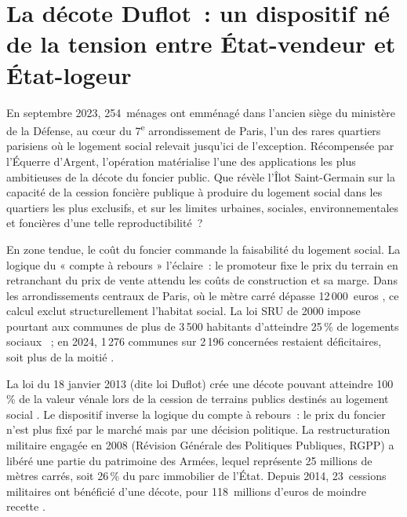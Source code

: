 \documentclass[a4paper,12pt]{article}
\begin{document}
\newpage
{}

\section{La décote Duflot~: un dispositif né de la tension entre État-vendeur et État-logeur}

En septembre 2023, 254~ménages ont emménagé dans l'ancien siège du ministère de la Défense, au cœur du 7\textsuperscript{e} arrondissement de Paris, l'un des rares quartiers parisiens où le logement social relevait jusqu'ici de l'exception. Récompensée par l'Équerre d'Argent, l'opération matérialise l'une des applications les plus ambitieuses de la décote du foncier public. Que révèle l'Îlot Saint-Germain sur la capacité de la cession foncière publique à produire du logement social dans les quartiers les plus exclusifs, et sur les limites urbaines, sociales, environnementales et foncières d'une telle reproductibilité~?

En zone tendue, le coût du foncier commande la faisabilité du logement social. La logique du « compte à rebours » l'éclaire~: le promoteur fixe le prix du terrain en retranchant du prix de vente attendu les coûts de construction et sa marge. Dans les arrondissements centraux de Paris, où le mètre carré dépasse 12\,000~euros \parencite{BanqueDesTerritoires2018IlotSG}, ce calcul exclut structurellement l'habitat social. La loi SRU de 2000 impose pourtant aux communes de plus de 3\,500 habitants d'atteindre 25\,\% de logements sociaux \parencite{LoiSRU2000}~; en 2024, 1\,276 communes sur 2\,196 concernées restaient déficitaires, soit plus de la moitié \parencite{MinistereLogement2024SRU}.

La loi du 18 janvier 2013 (dite loi Duflot) crée une décote pouvant atteindre 100\,\% de la valeur vénale lors de la cession de terrains publics destinés au logement social \parencite{LoiDuflot2013}. Le dispositif inverse la logique du compte à rebours~: le prix du foncier n'est plus fixé par le marché mais par une décision politique. La restructuration militaire engagée en 2008 (Révision Générale des Politiques Publiques, RGPP) a libéré une partie du patrimoine des Armées, lequel représente 25 millions de mètres carrés, soit 26\,\% du parc immobilier de l'État. Depuis 2014, 23~cessions militaires ont bénéficié d'une décote, pour 118~millions d'euros de moindre recette \parencite{CourDesComptes2024CessionsMilitaires, Senat2017ParcImmobilierArmees}.
\end{document}

